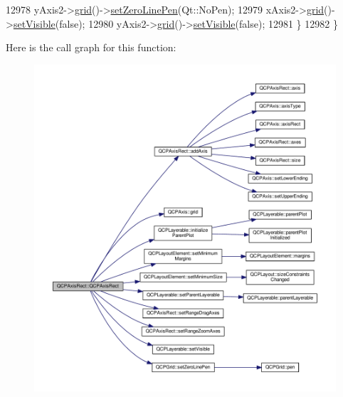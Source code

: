 \begin{DoxyCode}
12978     yAxis2->\hyperlink{class_q_c_p_axis_ac4fb913cce3072b5e75a4635e0f6cd04}{grid}()->\hyperlink{class_q_c_p_grid_a209f40fdb252397b418b82d3494d8ea0}{setZeroLinePen}(Qt::NoPen);
12979     xAxis2->\hyperlink{class_q_c_p_axis_ac4fb913cce3072b5e75a4635e0f6cd04}{grid}()->\hyperlink{class_q_c_p_layerable_a3bed99ddc396b48ce3ebfdc0418744f8}{setVisible}(\textcolor{keyword}{false});
12980     yAxis2->\hyperlink{class_q_c_p_axis_ac4fb913cce3072b5e75a4635e0f6cd04}{grid}()->\hyperlink{class_q_c_p_layerable_a3bed99ddc396b48ce3ebfdc0418744f8}{setVisible}(\textcolor{keyword}{false});
12981   \}
12982 \}
\end{DoxyCode}


Here is the call graph for this function\+:\nopagebreak
\begin{figure}[H]
\begin{center}
\leavevmode
\includegraphics[width=350pt]{class_q_c_p_axis_rect_a60b31dece805462c1b82eea2e69ba042_cgraph}
\end{center}
\end{figure}


\hypertarget{class_q_c_p_axis_rect_a463c44b1856ddbf82eb3f7b582839cd0}{}
